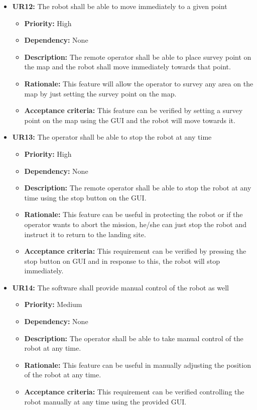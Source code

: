 \documentclass[10pt,a4paper,titlepage]{article}
\begin{document}
    \begin{itemize}
		\item \textbf{UR12:} The robot shall be able to move immediately to a given point
		\begin{itemize}
			\item \textbf{Priority:} High
            \item \textbf{Dependency:} None
			\item \textbf{Description:} The remote operator shall be able to place survey point on the map and the robot shall move immediately towards that point. 
            \item \textbf{Rationale:}  This feature will allow the operator to survey any area on the map by just setting the survey point on the map.
            \item \textbf{Acceptance criteria:}  This feature can be verified by setting a survey point on the map using the GUI and the robot will move towards it. 
		\end{itemize} 
	\end{itemize}
    \begin{itemize}
		\item \textbf{UR13:} The operator shall be able to stop the robot at any time
		\begin{itemize}
			\item \textbf{Priority:} High
            \item \textbf{Dependency:} None
			\item \textbf{Description:} The remote operator shall be able to stop the robot at any time using the stop button on the GUI.
            \item \textbf{Rationale:} This feature can be useful in protecting the robot or if the operator wants to abort the mission, he/she can just stop the robot and instruct it to return to the landing site.  
            \item \textbf{Acceptance criteria:} This requirement can be verified by pressing the stop button on GUI and in response to this, the robot will stop immediately. 
		\end{itemize} 
	\end{itemize} 
     \begin{itemize}
		\item \textbf{UR14:} The software shall provide manual control of the robot as well
		\begin{itemize}
			\item \textbf{Priority:} Medium
            \item \textbf{Dependency:} None
			\item \textbf{Description:}  The operator shall be able to take manual control of the robot at any time.   
            \item \textbf{Rationale:} This feature can be useful in manually adjusting the position of the robot at any time. 
            \item \textbf{Acceptance criteria:} This requirement can be verified controlling the robot manually at any time using the provided GUI. 
		\end{itemize} 
	\end{itemize}
\end{document}
